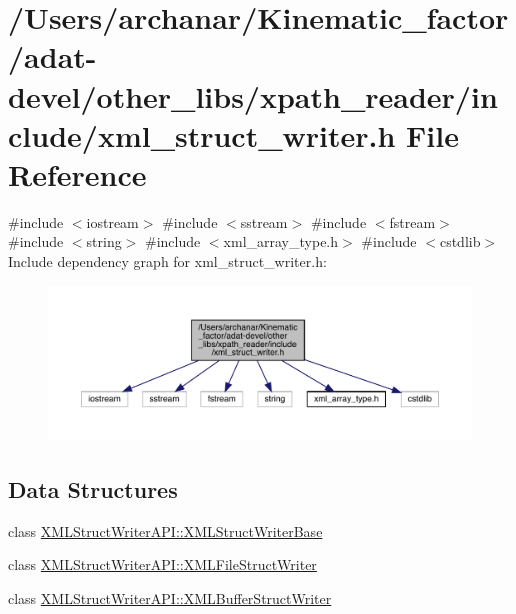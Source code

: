 \hypertarget{adat-devel_2other__libs_2xpath__reader_2include_2xml__struct__writer_8h}{}\section{/\+Users/archanar/\+Kinematic\+\_\+factor/adat-\/devel/other\+\_\+libs/xpath\+\_\+reader/include/xml\+\_\+struct\+\_\+writer.h File Reference}
\label{adat-devel_2other__libs_2xpath__reader_2include_2xml__struct__writer_8h}
{\ttfamily \#include $<$iostream$>$}\newline
{\ttfamily \#include $<$sstream$>$}\newline
{\ttfamily \#include $<$fstream$>$}\newline
{\ttfamily \#include $<$string$>$}\newline
{\ttfamily \#include $<$xml\+\_\+array\+\_\+type.\+h$>$}\newline
{\ttfamily \#include $<$cstdlib$>$}\newline
Include dependency graph for xml\+\_\+struct\+\_\+writer.\+h\+:
\nopagebreak
\begin{figure}[H]
\begin{center}
\leavevmode
\includegraphics[width=350pt]{d5/d9d/adat-devel_2other__libs_2xpath__reader_2include_2xml__struct__writer_8h__incl}
\end{center}
\end{figure}
\subsection*{Data Structures}
\begin{DoxyCompactItemize}
\item 
class \mbox{\hyperlink{classXMLStructWriterAPI_1_1XMLStructWriterBase}{X\+M\+L\+Struct\+Writer\+A\+P\+I\+::\+X\+M\+L\+Struct\+Writer\+Base}}
\item 
class \mbox{\hyperlink{classXMLStructWriterAPI_1_1XMLFileStructWriter}{X\+M\+L\+Struct\+Writer\+A\+P\+I\+::\+X\+M\+L\+File\+Struct\+Writer}}
\item 
class \mbox{\hyperlink{classXMLStructWriterAPI_1_1XMLBufferStructWriter}{X\+M\+L\+Struct\+Writer\+A\+P\+I\+::\+X\+M\+L\+Buffer\+Struct\+Writer}}
\end{DoxyCompactItemize}
